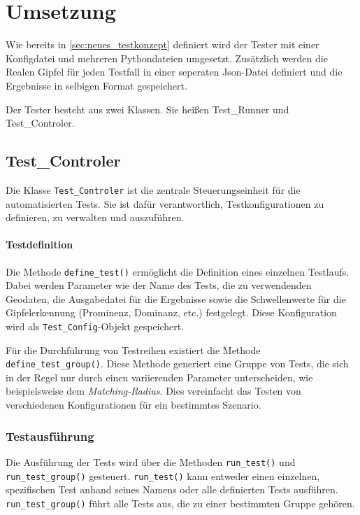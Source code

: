\section{Umsetzung}\label{sec:umsetzung_testen}
Wie bereits in \ref{sec:neues_testkonzept} definiert wird der Tester mit einer Konfigdatei und mehreren Pythondateien umgesetzt.  Zusätzlich werden die Realen Gipfel für jeden Testfall in einer seperaten Json-Datei definiert und die Ergebnisse in selbigen Format gespeichert. 

Der Tester besteht aus zwei Klassen. Sie heißen Test\_Runner und Test\_Controler. 

\subsection{Test\_Controler}\label{subsec:test_controler}


Die Klasse \verb|Test_Controler| ist die zentrale Steuerungseinheit für die automatisierten Tests. Sie ist dafür verantwortlich, Testkonfigurationen zu definieren, zu verwalten und auszuführen.

\paragraph{Testdefinition}
Die Methode \verb|define_test()| ermöglicht die Definition eines einzelnen Testlaufs. Dabei werden Parameter wie der Name des Tests, die zu verwendenden Geodaten, die Ausgabedatei für die Ergebnisse sowie die Schwellenwerte für die Gipfelerkennung (Prominenz, Dominanz, etc.) festgelegt. Diese Konfiguration wird als \verb|Test_Config|-Objekt gespeichert.

Für die Durchführung von Testreihen existiert die Methode \verb|define_test_group()|. Diese Methode generiert eine Gruppe von Tests, die sich in der Regel nur durch einen variierenden Parameter unterscheiden, wie beispielsweise dem \textit{Matching-Radius}. Dies vereinfacht das Testen von verschiedenen Konfigurationen für ein bestimmtes Szenario.

\subsubsection{Testausführung}
Die Ausführung der Tests wird über die Methoden \verb|run_test()| und \verb|run_test_group()| gesteuert. \verb|run_test()| kann entweder einen einzelnen, spezifischen Test anhand seines Namens oder alle definierten Tests ausführen. \verb|run_test_group()| führt alle Tests aus, die zu einer bestimmten Gruppe gehören.

